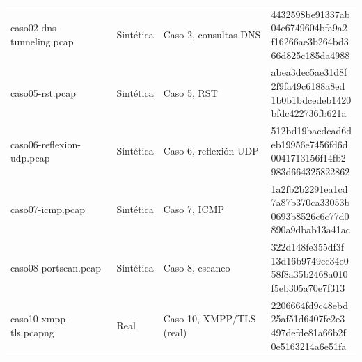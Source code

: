 {\begin{longtable}{@{}p{4.6cm}p{2cm}p{4.4cm}p{2.9cm}@{}}
{\ttfamily\scriptsize caso02-dns-tunneling.pcap} & Sintética & Caso 2, consultas DNS & \cod{\scriptsize 4432598be91337ab\newline 04e6749604bfa9a2\newline f16266ae3b264bd3\newline 66d825c185da4988}\\
{\ttfamily\scriptsize caso05-rst.pcap} & Sintética & Caso 5, RST & \cod{\scriptsize abea3dec5ae31d8f\newline 2f9fa49c6188a8ed\newline 1b0b1bdcedeb1420\newline bfdc422736fb621a}\\
{\ttfamily\scriptsize caso06-reflexion-udp.pcap} & Sintética & Caso 6, reflexión UDP & \cod{\scriptsize 512bd19bacdcad6d\newline eb19956e7456fd6d\newline 0041713156f14fb2\newline 983d664325822862}\\
{\ttfamily\scriptsize caso07-icmp.pcap} & Sintética & Caso 7, ICMP & \cod{\scriptsize 1a2fb2b2291ea1cd\newline 7a87b370ca33053b\newline 0693b8526c6c77d0\newline 890a9dbab13a41ac}\\
{\ttfamily\scriptsize caso08-portscan.pcap} & Sintética & Caso 8, escaneo & \cod{\scriptsize 322d148fe355df3f\newline 13d16b9749cc34e0\newline 58f8a35b2468a010\newline f5eb305a70e7f313}\\
{\ttfamily\scriptsize caso10-xmpp-tls.pcapng} & Real & Caso 10, XMPP/TLS (real) & \cod{\scriptsize 2206664fd9c48ebd\newline 25af51d6407fc2e3\newline 497defde81a66b2f\newline 0e5163214a6e51fa}\\
\bottomrule
\end{longtable}}


